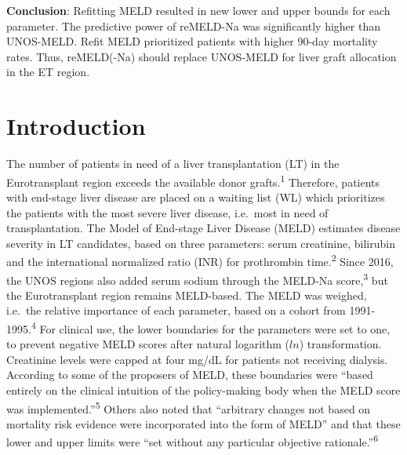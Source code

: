 \documentclass[11pt,english,]{book} %
\begin{document}
\textbf{Conclusion}: Refitting MELD resulted in new lower and upper bounds for each parameter. The predictive power of reMELD-Na was significantly higher than UNOS-MELD. Refit MELD prioritized patients with higher 90-day mortality rates. Thus, reMELD(-Na) should replace UNOS-MELD for liver graft allocation in the ET region.

\newpage
\normalsize

\hypertarget{introduction-1}{%
\section*{Introduction}\label{introduction-1}}

The number of patients in need of a liver transplantation (LT) in the Eurotransplant region exceeds the available donor grafts.\textsuperscript{1} Therefore, patients with end-stage liver disease are placed on a waiting list (WL) which prioritizes the patients with the most severe liver disease, i.e.~most in need of transplantation. The Model of End-stage Liver Disease (MELD) estimates disease severity in LT candidates, based on three parameters: serum creatinine, bilirubin and the international normalized ratio (INR) for prothrombin time.\textsuperscript{2} Since 2016, the UNOS regions also added serum sodium through the MELD-Na score,\textsuperscript{3} but the Eurotransplant region remains MELD-based. The MELD was weighed, i.e.~the relative importance of each parameter, based on a cohort from 1991-1995.\textsuperscript{4} For clinical use, the lower boundaries for the parameters were set to one, to prevent negative MELD scores after natural logarithm (\(ln\)) transformation. Creatinine levels were capped at four mg/dL for patients not receiving dialysis. According to some of the proposers of MELD, these boundaries were ``based entirely on the clinical intuition of the policy-making body when the MELD score was implemented.''\textsuperscript{5} Others also noted that ``arbitrary changes not based on mortality risk evidence were incorporated into the form of MELD'' and that these lower and upper limits were ``set without any particular objective rationale.''\textsuperscript{6}
\end{document}

